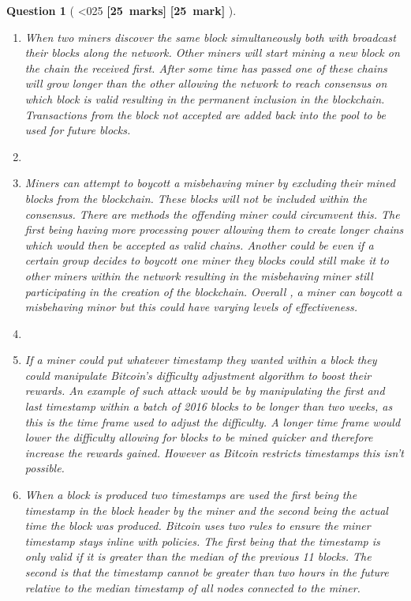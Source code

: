 \documentclass[a4paper]{article}
\theoremstyle{que}
\newtheorem{question}{Question}
\newcommand{\fixoffset}{\mbox{}\vspace*{-\bigskipamount}\vspace*{-\medskipamount}}
\newcommand\points[1]{%
\ifnum1<0#1\relax%
    {\bf \small [#1~marks]}%
  \else%
    {\bf \small [#1~mark]}%
  \fi%
}%
\begin{document}
\begin{question}[\points{25}]
  \fixoffset
  \begin{enumerate}[label=(\alph*)]
    \item When two miners discover the same block simultaneously both with broadcast their blocks along the network. Other miners will start mining a new block on the chain the received first. After some time has passed one of these chains will grow longer than the other allowing the network to reach consensus on which block is valid resulting in the permanent inclusion in the blockchain. Transactions from the block not accepted are added back into the pool to be used for future blocks. \cite{nakamoto2008bitcoin}
    \item 
    \item Miners can attempt to boycott a misbehaving miner by excluding their mined blocks from the blockchain. These blocks will not be included within the consensus. There are methods the offending miner could circumvent this. The first being having more processing power allowing them to create longer chains which would then be accepted as valid chains. Another could be even if a certain group decides to boycott one miner they blocks could still make it to other miners within the network resulting in the misbehaving miner still participating in the creation of the blockchain. Overall , a miner can boycott a misbehaving minor but this could have varying levels of effectiveness.
    \item 
    \item[(i)] If a miner could put whatever timestamp they wanted within a block they could manipulate Bitcoin's difficulty adjustment algorithm to boost their rewards. An example of such attack would be by manipulating the first and last timestamp within a batch of 2016 blocks to be longer than two weeks, as this is the time frame used to adjust the difficulty. A longer time frame would lower the difficulty allowing for blocks to be mined quicker and therefore increase the rewards gained. However as Bitcoin restricts timestamps this isn't possible.
    \item[(ii)] When a block is produced two timestamps are used the first being the timestamp in the block header by the miner and the second being the actual time the block was produced. Bitcoin uses two rules to ensure the miner timestamp stays inline with policies. The first being that the timestamp is only valid if it is greater than the median of the previous 11 blocks. The second is that the timestamp cannot be greater than two hours in the future relative to the median timestamp of all nodes connected to the miner. \cite{bitcoinwiki_block_timestamp} \cite{bitmex_block_timestamp}

\end{enumerate}
\end{question}
\end{document}
